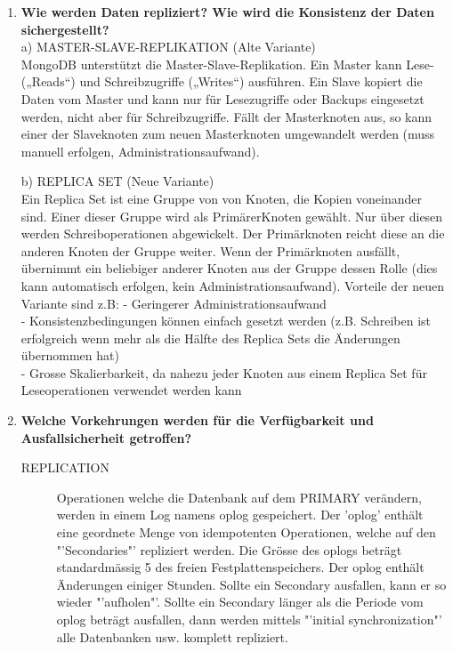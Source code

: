 \documentclass[a4paper,10pt,titlepage=false]{scrreprt}
\newcommand{\pic}[2][figure]{\begin{figure}[h]
 \centering
 \texttt{[image: \#2]}
 \caption{#1}
\end{figure}
}
\begin{document}
\begin{enumerate}
\begin{itemize}
\item Jedes Dokument in der gleichen Sammlung kann verschiedene Felder haben.
\item Das Format wird BSON genannt und ist ähnlich wie JSON, jedoch in binärer Form damit es schneller Verarbeitet werden kann.
\item \pic{mdbapi.png}
\item \pic{mdbapi2.png}
\item \pic{mdbapiextra.png}
\item \pic{mdbsh.png}
  \end{itemize}
\item \textbf{Wie werden Daten repliziert? Wie wird die Konsistenz der Daten sichergestellt?}\\
a) MASTER-SLAVE-REPLIKATION (Alte Variante)\\
MongoDB unterstützt die Master-Slave-Replikation. Ein Master kann Lese- („Reads“) und Schreibzugriffe („Writes“) ausführen. Ein Slave kopiert die Daten vom Master und kann nur für Lesezugriffe oder Backups eingesetzt werden, nicht aber für Schreibzugriffe. Fällt der Masterknoten aus, so kann einer der Slaveknoten zum neuen Masterknoten umgewandelt werden (muss manuell erfolgen, Administrationsaufwand).

b) REPLICA SET (Neue Variante)\\
Ein Replica Set ist eine Gruppe von von Knoten, die Kopien voneinander sind. Einer dieser Gruppe wird als PrimärerKnoten gewählt. Nur über diesen werden Schreiboperationen abgewickelt. Der Primärknoten reicht diese an die anderen Knoten der Gruppe weiter. Wenn der Primärknoten ausfällt, übernimmt ein beliebiger anderer Knoten aus der Gruppe dessen Rolle (dies kann automatisch erfolgen, kein Administrationsaufwand). Vorteile der neuen Variante sind z.B:
- Geringerer Administrationsaufwand\\
- Konsistenzbedingungen können einfach gesetzt werden (z.B. Schreiben ist erfolgreich wenn mehr als die Hälfte des Replica Sets die Änderungen übernommen hat)\\
- Grosse Skalierbarkeit, da nahezu jeder Knoten aus einem Replica Set für Leseoperationen verwendet werden kann\\
\item \textbf{Welche Vorkehrungen werden für die Verfügbarkeit und Ausfallsicherheit getroffen?} \\
\begin{description}
\item[REPLICATION]
Operationen welche die Datenbank auf dem PRIMARY verändern, werden in einem Log namens
oplog gespeichert. Der 'oplog' enthält eine geordnete Menge von idempotenten Operationen,
welche auf den "'Secondaries"' repliziert werden. Die Grösse des oplogs beträgt standardmässig 5%
des freien Festplattenspeichers. Der oplog enthält Änderungen einiger Stunden.
Sollte ein Secondary ausfallen, kann er so wieder "'aufholen"'. Sollte ein Secondary länger als
die Periode vom oplog beträgt ausfallen, dann werden mittels "'initial synchronization"' alle Datenbanken usw. komplett
repliziert.


\end{description}
\end{enumerate}
\end{document}
